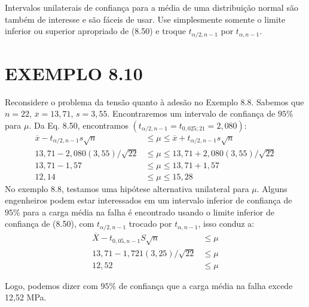 \documentclass[a4paper,12pt]{article} %
\begin{document}
	Intervalos unilaterais de confiança para a média de uma distribuição normal são também de interesse e são fáceis de usar. Use simplesmente somente o limite inferior ou superior apropriado de (8.50) e troque $ t_{\alpha / 2, n-1} $ por $ t_{\alpha, n-1} $.
	
	
	\section*{EXEMPLO 8.10}
	Reconsidere o problema da tensão quanto à adesão no Exemplo 8.8. Sabemos que $n = 22$, $\overline{x} = 13,71$, $s=3,55$. Encontraremos um intervalo de confiança de $ 95\% $ para $\mu$. Da Eq. 8.50, encontramos $ \left(t_{\alpha / 2, n-1} = t_{0,025; 21} = 2,080 \right)  $:
	\begin{align*} 
		\overline{x} - t_{\alpha / 2, n-1} s \sqrt{n}  & \leq \mu \leq  \overline{x} + t_{\alpha / 2, n-1} s \sqrt{n}  \\ 
		13,71 - 2,080 \left( 3,55 \right) / \sqrt{22}  & \leq \mu \leq  13,71 + 2,080 \left( 3,55 \right) / \sqrt{22}  \\
		13,71 - 1,57  & \leq \mu \leq  13,71 + 1,57 \\
		12,14  & \leq \mu \leq  15,28
	\end{align*}
	No exemplo 8.8, testamos uma hipótese alternativa unilateral para $ \mu $. Alguns engenheiros podem estar interessados em um intervalo inferior de confiança de $95\%$ para a carga média na falha é encontrado usando o limite inferior de confiança de (8.50), com $t_{\alpha / 2, n-1}$ trocado por $t_{\alpha, n-1}$, isso conduz a:
	\begin{align*} 
		\overline{X} - t_{0,05, n-1} S \sqrt{n}  & \leq \mu  \\ 
		13,71 - 1,721 \left( 3,25 \right) / \sqrt{22}  & \leq \mu  \\ 
		12,52 & \leq \mu
	\end{align*}

	Logo, podemos dizer com $95\%$ de confiança que a carga média na falha excede 12,52 MPa.
	
	

	
	
	
\end{document}
